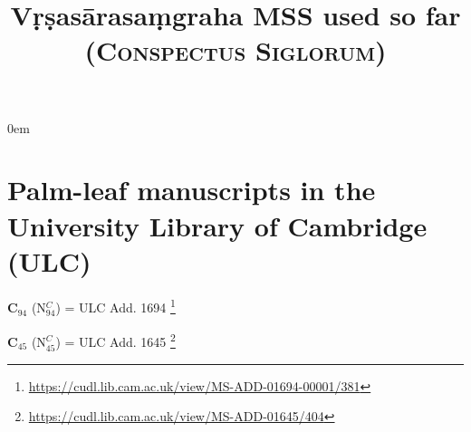 \documentclass[11pt]{article} %
\title{{\Huge Vṛṣasārasaṃgraha MSS used so far}\\ \vspace{.5em}
\textsc{\huge (Conspectus Siglorum)}}
\date{} %
\begin{document}
\maketitle

\parindent0em


\section{Palm-leaf manuscripts in the University Library of Cambridge (ULC)}




{\large\textbf{C$_{\scriptscriptstyle 94}$} 
(N$^{\scriptscriptstyle C}_{\scriptscriptstyle 94}$) = 
ULC Add. 1694}%
     \footnote{\url{https://cudl.lib.cam.ac.uk/view/MS-ADD-01694-00001/381}}
\bigskip

{\large\textbf{C$_{\scriptscriptstyle 45}$} 
(N$^{\scriptscriptstyle C}_{\scriptscriptstyle 45}$) = 
ULC Add. 1645}%
     \footnote{\url{https://cudl.lib.cam.ac.uk/view/MS-ADD-01645/404}}
\bigskip
\end{document}
